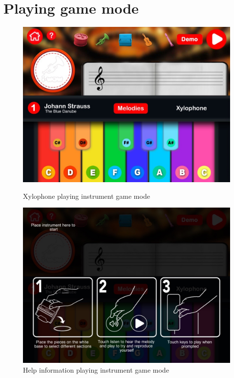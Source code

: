 \section{Playing game mode}

\begin{figure}[ht!]
  \centering
  \includegraphics[width=350pt]{graphics/use-case/playing_xylo_start_screen.jpg}
  \vspace{0.05cm}
  \caption{Xylophone playing instrument game mode}
  \label{fig:playing_xylo_start_screen}
  \vspace{0.6cm}

  \includegraphics[width=350pt]{graphics/use-case/help_playing_screen.jpg}
  \vspace{0.05cm}
  \caption{Help information playing instrument game mode}
  \label{fig:help_playing_screen}
\end{figure}

